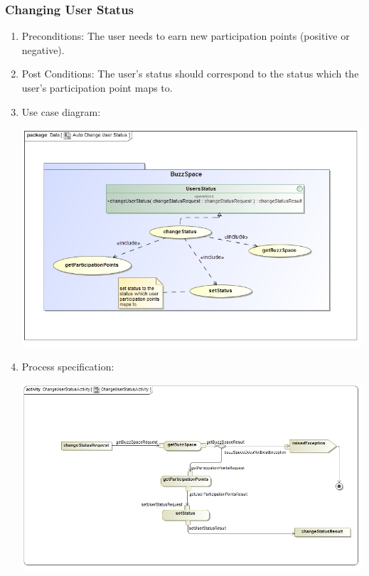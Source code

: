 \documentclass[hidelinks, 12pt, oneside]{article}
\begin{document}
\subsubsection{Changing User Status}
\begin{enumerate}
\item Preconditions: The user needs to earn new participation points (positive or negative).
\item Post Conditions: The user's status should correspond to the status which the user's participation point maps to.
\item Use case diagram:\\
\centerline{\includegraphics[scale=0.5]{AutoChangeUserStatus.jpg}}
 \item Process specification:\\
\centerline{\includegraphics[scale=0.5]{ChangeUserStatusActivity.jpg}}

\end{enumerate}
\end{document}
